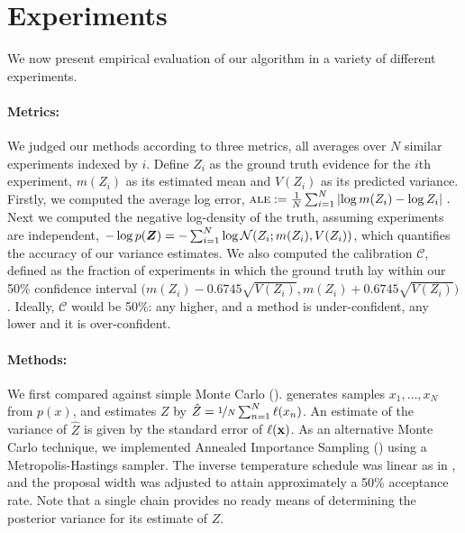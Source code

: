 \documentclass{article} %
\begin{document}
\section{Experiments}
\label{sec:experiments}



We now present empirical evaluation of our algorithm in a variety of different experiments.

\paragraph{Metrics:} We judged our methods according to three metrics, all averages over $N$ similar experiments indexed by $i$. Define $Z_i$ as the ground truth evidence for the $i$th experiment, $m(Z_i)$ as its estimated mean  and $V(Z_i)$  as its predicted variance. Firstly, we computed the average log error,
$
\acro{ale} 
\deq \frac{1}{N} \sum_{i=1}^{N} \left|{\log m(Z_i) - \log Z_i}\right|\,.
$
Next we computed the negative log-density of the truth, assuming experiments are independent,
$
-\log p(\vect{Z}) = -\sum_{i=1}^{N} \log \N{Z_i}{m(Z_i)}{V(Z_i)}
$, which quantifies the accuracy of our variance estimates. We also computed the calibration $\mathcal{C}$, defined as the fraction of experiments in which the ground truth lay within our 50\% confidence interval $\bigl(m(Z_i) - 0.6745 \surd{V(Z_i)}, m(Z_i) + 0.6745 \surd{V(Z_i)}\bigr)$. Ideally, $\mathcal{C}$ would be  50\%: any higher, and a method is under-confident, any lower and it is over-confident. 

\paragraph{Methods:} We first compared against simple Monte Carlo ().  generates samples $x_1, \dots, x_N$ from $p(x)$, and estimates $Z$ by $\hat{Z} = \nicefrac{1}{N} \sum_{n=1}^{N} \lfn(x_n)$.  An estimate of the variance of $\hat{Z}$ is given by the standard error of $\lfn({\bf x})$. As an alternative Monte Carlo technique, we implemented Annealed Importance Sampling () using a Metropolis-Hastings sampler.  The inverse temperature schedule was linear as in \cite{BZMonteCarlo}, and the proposal width was adjusted to attain approximately a 50\% acceptance rate. Note that a single  chain provides no ready means of determining the posterior variance for its  estimate of $Z$.  

\end{document}
